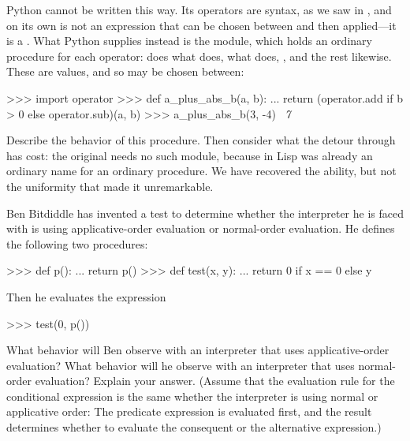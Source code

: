\begin{exerciseGroup}
\noindent
Python cannot be written this way.  Its operators are syntax, as we saw in
, and \code{+} on its own is not an expression that can be
chosen between and then applied---it is a .  What Python
supplies instead is the  module, which holds an ordinary
procedure for each operator:  does what \code{+} does,
 what \code{-} does, , 
and the rest likewise.  These are values, and so may be chosen between:

\begin{codeBlock}
>>> import operator
>>> def a_plus_abs_b(a, b):
...     return (operator.add if b > 0 else operator.sub)(a, b)
>>> a_plus_abs_b(3, -4)
~\textit{7}~
\end{codeBlock}

\noindent
Describe the behavior of this procedure.  Then consider what the detour through
 has cost: the original needs no such module, because in Lisp
\code{+} was already an ordinary name for an ordinary procedure.  We have
recovered the ability, but not the uniformity that made it unremarkable.

\label{Exercise 1.5}
 Ben Bitdiddle has invented a test
to determine whether the interpreter he is faced with is using
applicative-order evaluation or normal-order evaluation.  He defines the
following two procedures:

\begin{codeBlock}
>>> def p():
...     return p()
>>> def test(x, y):
...     return 0 if x == 0 else y
\end{codeBlock}

Then he evaluates the expression

\begin{codeBlock}
>>> test(0, p())
\end{codeBlock}

What behavior will Ben observe with an interpreter that uses applicative-order
evaluation?  What behavior will he observe with an interpreter that uses
normal-order evaluation?  Explain your answer.  (Assume that the evaluation
rule for the conditional expression is the same whether the interpreter is
using normal or applicative order: The predicate expression is evaluated first,
and the result determines whether to evaluate the consequent or the alternative
expression.)
\end{exerciseGroup}


